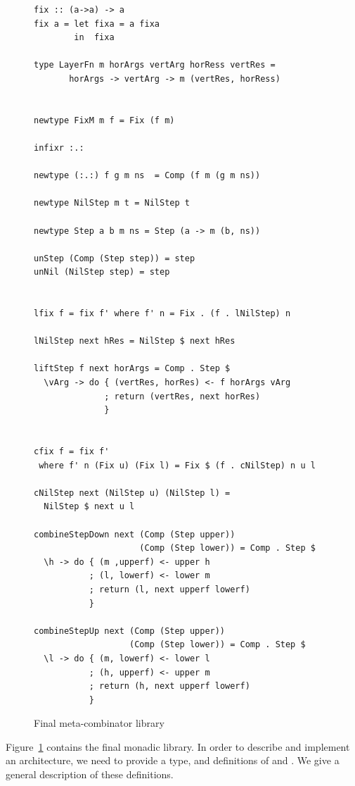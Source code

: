\documentclass[preprint,natbib]{sigplanconf}
\begin{document}
\begin{figure}
\begin{small}
\begin{center}
\begin{footnotesize}
\begin{verbatim}
fix :: (a->a) -> a
fix a = let fixa = a fixa
        in  fixa

type LayerFn m horArgs vertArg horRess vertRes =
       horArgs -> vertArg -> m (vertRes, horRess)


newtype FixM m f = Fix (f m)

infixr :.:

newtype (:.:) f g m ns  = Comp (f m (g m ns))

newtype NilStep m t = NilStep t

newtype Step a b m ns = Step (a -> m (b, ns))

unStep (Comp (Step step)) = step
unNil (NilStep step) = step


lfix f = fix f' where f' n = Fix . (f . lNilStep) n

lNilStep next hRes = NilStep $ next hRes

liftStep f next horArgs = Comp . Step $ 
  \vArg -> do { (vertRes, horRes) <- f horArgs vArg
              ; return (vertRes, next horRes)
              }
              

cfix f = fix f' 
 where f' n (Fix u) (Fix l) = Fix $ (f . cNilStep) n u l

cNilStep next (NilStep u) (NilStep l) = 
  NilStep $ next u l

combineStepDown next (Comp (Step upper)) 
                     (Comp (Step lower)) = Comp . Step $
  \h -> do { (m ,upperf) <- upper h
           ; (l, lowerf) <- lower m
           ; return (l, next upperf lowerf)   
           }

combineStepUp next (Comp (Step upper)) 
                   (Comp (Step lower)) = Comp . Step $
  \l -> do { (m, lowerf) <- lower l
           ; (h, upperf) <- upper m
           ; return (h, next upperf lowerf)
           }
\end{verbatim} %
\end{footnotesize}\caption{Final meta-combinator library}\label{fig:metacombinators} 
\end{center}
\end{small}
\end{figure}

Figure~\ref{fig:metacombinators} contains the final monadic library. In order to describe and implement an architecture, we need to provide a  type, and definitions of  and . We give a general description of these definitions.
\end{document}
